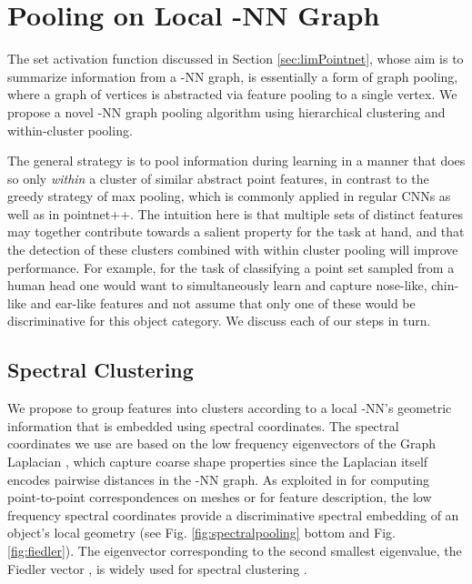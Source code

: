 \documentclass[runningheads]{llncs}
\begin{document}
\section{Pooling on Local -NN Graph}\label{sec:specpooling}
The set activation function discussed in Section \ref{sec:limPointnet}, whose aim is to summarize information from a -NN graph, is essentially a form of graph pooling, where a graph of  vertices is abstracted via feature pooling to a single vertex. We propose a novel -NN graph pooling algorithm using hierarchical clustering and within-cluster pooling.

The general strategy is to pool information during learning in a manner that does so only {\em within} a cluster of similar abstract point features, in contrast to the greedy strategy of max pooling, which is commonly applied in regular CNNs as well as in pointnet++. The intuition here is that multiple sets of distinct features may together contribute towards a salient property for the task at hand, and that the detection of these clusters combined with within cluster pooling will improve performance. For example, for the task of classifying a point set sampled from a human head one would want to simultaneously learn and capture nose-like, chin-like and ear-like features and not assume that only one of these would be discriminative for this object category. We discuss each of our steps in turn. 

\subsection{Spectral Clustering}\label{sec:eigL}
We propose to group features into clusters according to a local -NN's geometric information that is embedded using spectral coordinates. The spectral coordinates we use are based on the low frequency eigenvectors of the Graph Laplacian , which capture coarse shape properties since the Laplacian itself encodes pairwise distances in the -NN graph. As exploited in \cite{lombaert2013focusr} \cite{bronstein2008book} for computing point-to-point correspondences on meshes or for feature description, the low frequency spectral coordinates provide a discriminative spectral embedding of an object's local geometry (see Fig. \ref{fig:spectralpooling} bottom and Fig. \ref{fig:fiedler}). The eigenvector corresponding to the second smallest eigenvalue, the Fiedler vector \cite{chung1997spectral}, is widely used for spectral clustering \cite{shi2000normalized}.
\end{document}
